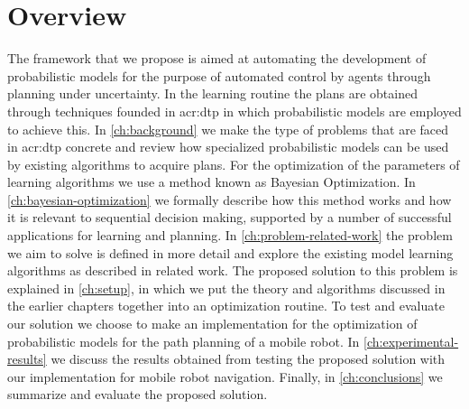 \section{Overview}
\label{sec:introduction-overview}

The framework that we propose is aimed at automating the development of probabilistic models for the purpose of automated control by agents through planning under uncertainty.
In the learning routine the plans are obtained through techniques founded in \acrlong{acr:dtp} in which probabilistic models are employed to achieve this.
In \autoref{ch:background} we make the type of problems that are faced in \acrshort{acr:dtp} concrete and review how specialized probabilistic models can be used by existing algorithms to acquire plans.
For the optimization of the parameters of learning algorithms we use a method known as Bayesian Optimization. In \autoref{ch:bayesian-optimization} we formally describe how this method works and how it is relevant to sequential decision making, supported by a number of successful applications for learning and planning.
In \autoref{ch:problem-related-work} the problem we aim to solve is defined in more detail and explore the existing model learning algorithms as described in related work.
The proposed solution to this problem is explained in \autoref{ch:setup}, in which we put the theory and algorithms discussed in the earlier chapters together into an optimization routine.
To test and evaluate our solution we choose to make an implementation for the optimization of probabilistic models for the path planning of a mobile robot.
In \autoref{ch:experimental-results} we discuss the results obtained from testing the proposed solution with our implementation for mobile robot navigation.
Finally, in \autoref{ch:conclusions} we summarize and evaluate the proposed solution.